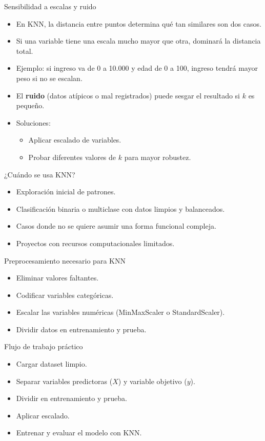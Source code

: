 \documentclass{beamer}
\begin{document}
\begin{frame}{Sensibilidad a escalas y ruido}
\begin{itemize}
    \item En KNN, la distancia entre puntos determina qué tan similares son dos casos.
    \item Si una variable tiene una escala mucho mayor que otra, dominará la distancia total.
    \item Ejemplo: si ingreso va de 0 a 10.000 y edad de 0 a 100, ingreso tendrá mayor peso si no se escalan.
    \item El \textbf{ruido} (datos atípicos o mal registrados) puede sesgar el resultado si $k$ es pequeño.
    \item Soluciones:
    \begin{itemize}
        \item Aplicar escalado de variables.
        \item Probar diferentes valores de $k$ para mayor robustez.
    \end{itemize}
\end{itemize}
\end{frame}

\begin{frame}{¿Cuándo se usa KNN?}
\begin{itemize}
    \item Exploración inicial de patrones.
    \item Clasificación binaria o multiclase con datos limpios y balanceados.
    \item Casos donde no se quiere asumir una forma funcional compleja.
    \item Proyectos con recursos computacionales limitados.
\end{itemize}
\end{frame}

\begin{frame}{Preprocesamiento necesario para KNN}
\begin{itemize}
    \item Eliminar valores faltantes.
    \item Codificar variables categóricas.
    \item Escalar las variables numéricas (MinMaxScaler o StandardScaler).
    \item Dividir datos en entrenamiento y prueba.
\end{itemize}
\end{frame}

\begin{frame}{Flujo de trabajo práctico}
\begin{itemize}
    \item Cargar dataset limpio.
    \item Separar variables predictoras ($X$) y variable objetivo ($y$).
    \item Dividir en entrenamiento y prueba.
    \item Aplicar escalado.
    \item Entrenar y evaluar el modelo con KNN.
\end{itemize}
\end{frame}
\end{document}
